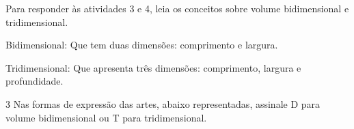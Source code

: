 \noindent{}Para responder às atividades 3 e 4, leia os conceitos sobre volume
bidimensional e tridimensional.

\begin{mdframed}[linewidth=2pt,linecolor=salmao,backgroundcolor=salmao!20]
Bidimensional: Que tem duas dimensões: comprimento e largura.

Tridimensional: Que apresenta três dimensões: comprimento, largura e profundidade.
\end{mdframed}

\num{3} Nas formas de expressão das artes, abaixo representadas, assinale D para volume bidimensional ou T para tridimensional.









